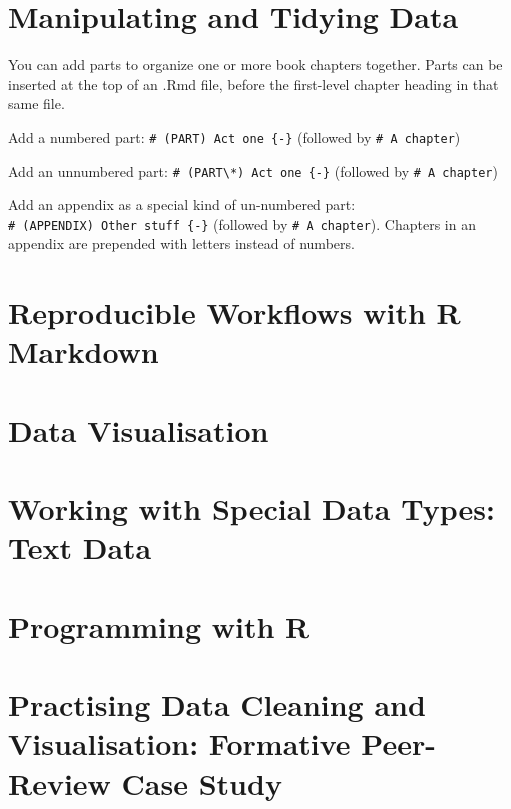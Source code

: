 \documentclass[
]{book}
\begin{document}
\hypertarget{manipulating-and-tidying-data}{%
\chapter{Manipulating and Tidying Data}\label{manipulating-and-tidying-data}}

You can add parts to organize one or more book chapters together. Parts can be inserted at the top of an .Rmd file, before the first-level chapter heading in that same file.

Add a numbered part: \texttt{\#\ (PART)\ Act\ one\ \{-\}} (followed by \texttt{\#\ A\ chapter})

Add an unnumbered part: \texttt{\#\ (PART\textbackslash{}*)\ Act\ one\ \{-\}} (followed by \texttt{\#\ A\ chapter})

Add an appendix as a special kind of un-numbered part: \texttt{\#\ (APPENDIX)\ Other\ stuff\ \{-\}} (followed by \texttt{\#\ A\ chapter}). Chapters in an appendix are prepended with letters instead of numbers.

\hypertarget{reproducible-workflows-with-r-markdown}{%
\chapter{Reproducible Workflows with R Markdown}\label{reproducible-workflows-with-r-markdown}}

\hypertarget{data-visualisation}{%
\chapter{Data Visualisation}\label{data-visualisation}}

\hypertarget{working-with-special-data-types-text-data}{%
\chapter{Working with Special Data Types: Text Data}\label{working-with-special-data-types-text-data}}

\hypertarget{programming-with-r}{%
\chapter{Programming with R}\label{programming-with-r}}

\hypertarget{practising-data-cleaning-and-visualisation-formative-peer-review-case-study}{%
\chapter{Practising Data Cleaning and Visualisation: Formative Peer-Review Case Study}\label{practising-data-cleaning-and-visualisation-formative-peer-review-case-study}}

  
\end{document}

